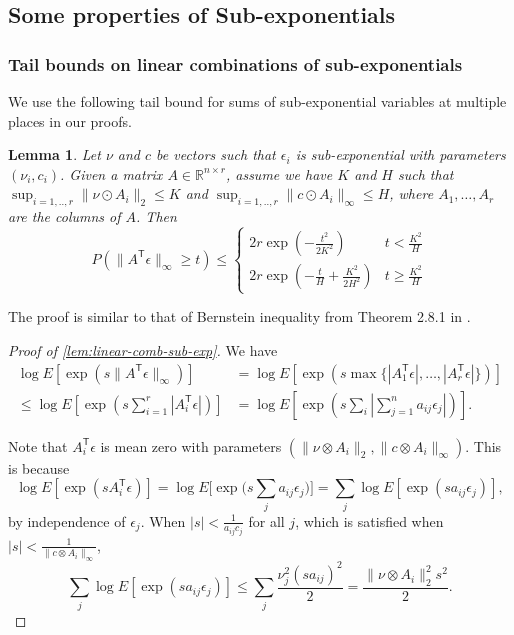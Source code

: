 \documentclass[ejs,noshowframe]{imsart}
\theoremstyle{plain}
\newtheorem{lemma}[theorem]{Lemma}
\theoremstyle{definition}
\newcommand{\snorm}[1]{\lVert #1 \rVert}
\newcommand{\R}{\mathbb{R}}
\newcommand{\E}{E}
\renewcommand{\top}{\mathsf{T}}
\begin{document}
\begin{appendix}
\subsection{Some properties of Sub-exponentials}

\subsubsection*{Tail bounds on linear combinations of sub-exponentials}
We use the following tail bound for sums of 
sub-exponential variables at multiple places in our proofs.
\begin{lemma}
  \label{lem:linear-comb-sub-exp}
  Let $\nu$
  and $c$ be vectors such that $\epsilon_{i}$ is sub-exponential with
  parameters $(\nu_{i}, c_{i})$. Given a matrix $A \in \R^{n\times r}$,
  assume we have $K$ and $H$ such that
  $\sup_{i=1,..,r} \snorm{\nu \odot A_{i}}_2 \leq K$ and $\sup_{i=1,..,r}
  \snorm{c \odot A_{i}}_{\infty} \leq H$, where $A_{1},\ldots,A_{r}$ are
  the columns of $A$. Then
  \begin{equation}
    P\left(\snorm{A^\top \epsilon}_{\infty} \geq t \right) \leq
    \begin{cases} 2 r \exp\left(-\frac{t^2}{2 K^2}\right) &  t < \frac{K^2}{H}\\
      2 r \exp\left(-\frac{t}{H} + \frac{K^2}{2 H^2} \right) & t \geq
      \frac{K^2}{H}
    \end{cases}
  \end{equation}
\end{lemma}
\noindent
The proof is similar to that of Bernstein inequality from Theorem 2.8.1 in 
\citep{Vershynin2018}.

\begin{proof}[Proof of \autoref{lem:linear-comb-sub-exp}]
  We have
  \begin{align}
    \log \E\left[\exp\left(s \|A^\top
    \epsilon\|_{\infty}\right)\right]
    & = \log \E\left[\exp\left(s
      \max\{|A_{1}^\top\epsilon|,\ldots,|A_{r}^\top\epsilon|\}\right)\right]\\
    \leq \log \E\left[\exp\left(s \sum_{i=1}^{r} |A_{i}^\top
      \epsilon|\right)\right]
    &= \log \E\left[\exp\left(s \sum_{i} |\sum_{j=1}^{n} a_{ij}
      \epsilon_{j}|\right) \right].
  \end{align}

  Note that $A_{i}^{\top} \epsilon$ is mean zero with parameters
  $(\snorm{\nu \otimes A_{i}}_2, \snorm{c \otimes A_{i}}_{\infty})$. This is 
because
  \begin{equation}
    \log \E\left[\exp(s A_{i}^\top \epsilon)\right]
    =\log \E\bigg[\exp\big(s \sum_{j} a_{ij}
        \epsilon_{j}\big)\bigg]
    =\sum_{j} \log \E\left[ \exp(s a_{ij} \epsilon_{j})\right],
  \end{equation}
  by independence of $\epsilon_{j}$.
  When $|s| < \frac{1}{a_{ij} c_{j}}$ for all $j$, which is satisfied when $|s| 
< \frac{1}{\|c \otimes A_{i}\|_{\infty}}$,
  \begin{equation}
    \sum_{j} \log \E\left[ \exp(s a_{ij} \epsilon_{j})\right] \leq
    \sum_{j} \frac{\nu_{j}^2 (s a_{ij})^2}{2}= \frac{\|\nu \otimes
      A_{i}\|_2^2 s^2}{2}.
  \end{equation}



\end{proof}
\end{appendix}
\end{document}
